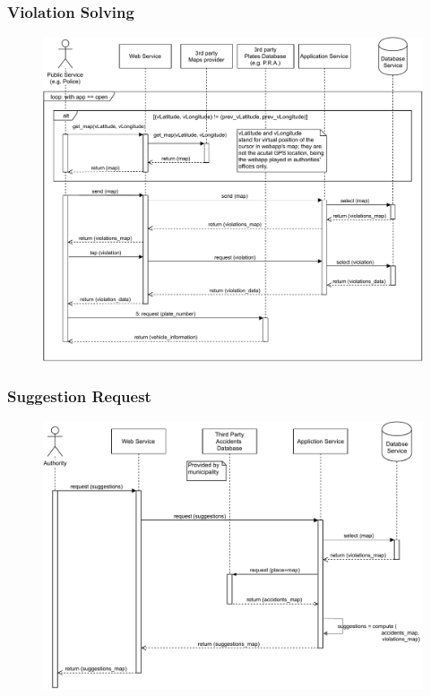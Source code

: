 \documentclass[12pt,a4paper]{article}
\begin{document}
\subsubsection{Violation Solving}
\begin{figure}[H]
				\centering
				\includegraphics[width=1\textwidth,height=0.9\textheight,keepaspectratio]{../assets/sequence_diagrams/exports/workflow_public_subject_1.pdf}
				\label{fig:workflow2_sequence}
			\end{figure}
\subsubsection{Suggestion Request}
\begin{figure}[H]
				\centering
				\includegraphics[width=1\textwidth,height=0.9\textheight,keepaspectratio]{../assets/sequence_diagrams/exports/suggestions_workflow.pdf}
				\label{fig:suggestion_sequence}
			\end{figure}
\newpage
\end{document}
